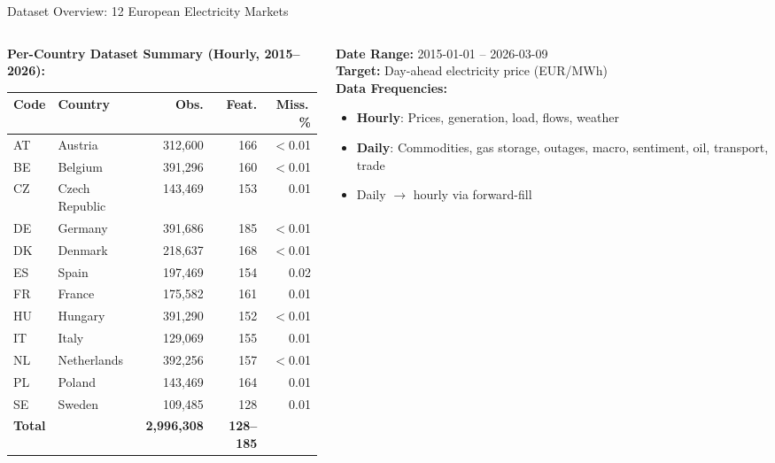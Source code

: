 \documentclass[aspectratio=169]{beamer}
\begin{document}
\begin{frame}{Dataset Overview: 12 European Electricity Markets}
\begin{columns}
\begin{column}{0.55\textwidth}
\textbf{Per-Country Dataset Summary (Hourly, 2015--2026):}
\vspace{0.15cm}

\begin{table}
\tiny
\begin{tabular}{ll r r r}
\toprule
\textbf{Code} & \textbf{Country} & \textbf{Obs.} & \textbf{Feat.} & \textbf{Miss.\,\%} \\
\midrule
AT & Austria        & 312,600  & 166 & $<$0.01 \\
BE & Belgium        & 391,296  & 160 & $<$0.01 \\
CZ & Czech Republic & 143,469  & 153 & 0.01 \\
DE & Germany        & 391,686  & 185 & $<$0.01 \\
DK & Denmark        & 218,637  & 168 & $<$0.01 \\
ES & Spain          & 197,469  & 154 & 0.02 \\
FR & France         & 175,582  & 161 & 0.01 \\
HU & Hungary        & 391,290  & 152 & $<$0.01 \\
IT & Italy          & 129,069  & 155 & 0.01 \\
NL & Netherlands    & 392,256  & 157 & $<$0.01 \\
PL & Poland         & 143,469  & 164 & 0.01 \\
SE & Sweden         & 109,485  & 128 & 0.01 \\
\midrule
\multicolumn{2}{l}{\textbf{Total}} & \textbf{2,996,308} & \textbf{128--185} & \\
\bottomrule
\end{tabular}
\end{table}
\end{column}

\begin{column}{0.45\textwidth}
\textbf{Date Range:} 2015-01-01 -- 2026-03-09 \\[0.15cm]
\textbf{Target:} Day-ahead electricity price (EUR/MWh) \\[0.15cm]

\textbf{Data Frequencies:}
\begin{itemize}\scriptsize
    \item \textbf{Hourly}: Prices, generation, load, flows, weather
    \item \textbf{Daily}: Commodities, gas storage, outages, macro, sentiment, oil, transport, trade
    \item Daily $\rightarrow$ hourly via forward-fill
\end{itemize}


\end{column}
\end{columns}
\end{frame}
\end{document}
